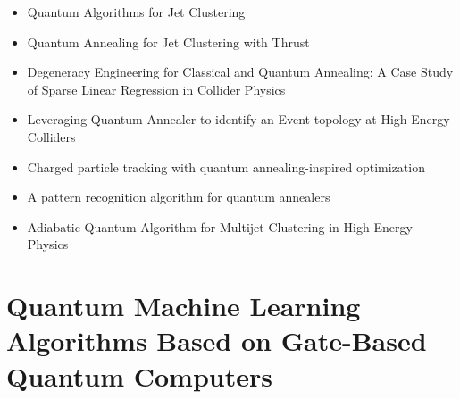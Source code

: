 \begin{itemize}
   \item Quantum Algorithms for Jet Clustering~\cite{Wei:2019rqy}
   \item Quantum Annealing for Jet Clustering with Thrust~\cite{Delgado:2022snu}
   \item Degeneracy Engineering for Classical and Quantum Annealing: A Case Study of Sparse Linear Regression in Collider Physics~\cite{Anschuetz:2022rwu}
   \item Leveraging Quantum Annealer to identify an Event-topology at High Energy Colliders~\cite{Kim:2021wrr}
   \item Charged particle tracking with quantum annealing-inspired optimization~\cite{Zlokapa:2019tkn}
   \item A pattern recognition algorithm for quantum annealers~\cite{Bapst:2019llh}
   \item Adiabatic Quantum Algorithm for Multijet Clustering in High Energy Physics~\cite{Pires:2020urc}
\end{itemize}


\section{Quantum Machine Learning Algorithms Based on Gate-Based Quantum Computers}

